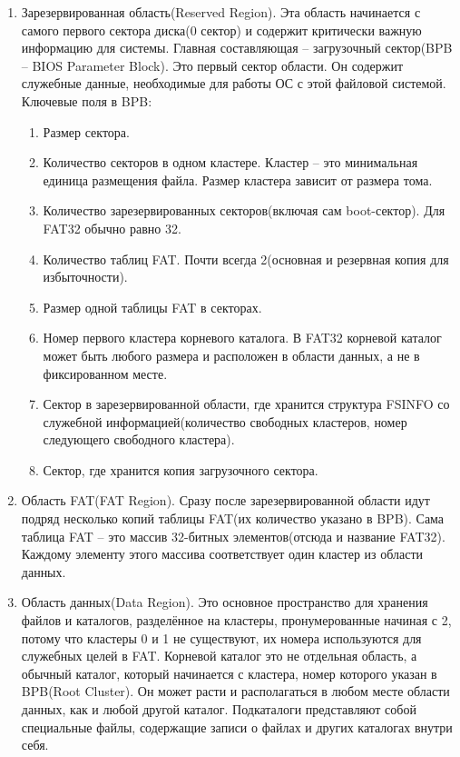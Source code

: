 \begin{enumerate}
\item Зарезервированная область(Reserved Region). Эта область начинается с самого первого сектора диска(0 сектор) и содержит критически важную информацию для системы. Главная составляющая -- загрузочный сектор(BPB -- BIOS Parameter Block). Это первый сектор области. Он содержит служебные данные, необходимые для работы ОС с этой файловой системой. Ключевые поля в BPB:
\begin{enumerate}
\item Размер сектора.
\item Количество секторов в одном кластере. Кластер -- это минимальная единица размещения файла. Размер кластера зависит от размера тома.
\item Количество зарезервированных секторов(включая сам boot-сектор). Для FAT32 обычно равно 32.
\item Количество таблиц FAT. Почти всегда 2(основная и резервная копия для избыточности).
\item Размер одной таблицы FAT в секторах.
\item Номер первого кластера корневого каталога. В FAT32 корневой каталог может быть любого размера и расположен в области данных, а не в фиксированном месте.
\item Сектор в зарезервированной области, где хранится структура FSINFO со служебной информацией(количество свободных кластеров, номер следующего свободного кластера).
\item Сектор, где хранится копия загрузочного сектора.
\end{enumerate}
\item Область FAT(FAT Region). Сразу после зарезервированной области идут подряд несколько копий таблицы FAT(их количество указано в BPB). Сама таблица FAT -- это массив 32-битных элементов(отсюда и название FAT32). Каждому элементу этого массива соответствует один кластер из области данных.
\item Область данных(Data Region). Это основное пространство для хранения файлов и каталогов, разделённое на кластеры, пронумерованные начиная с 2, потому что кластеры 0 и 1 не существуют, их номера используются для служебных целей в FAT. Корневой каталог это не отдельная область, а обычный каталог, который начинается с кластера, номер которого указан в BPB(Root Cluster). Он может расти и располагаться в любом месте области данных, как и любой другой каталог. Подкаталоги представляют собой специальные файлы, содержащие записи о файлах и других каталогах внутри себя.
\end{enumerate}

